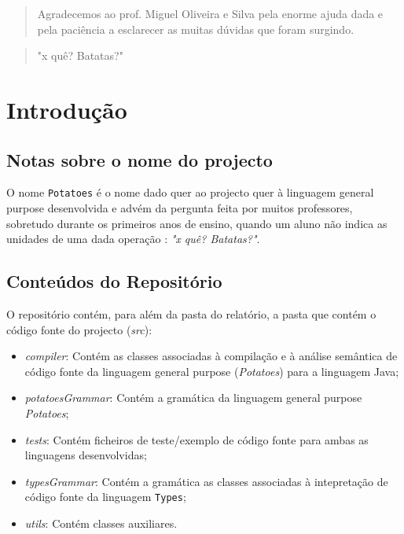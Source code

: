 \documentclass{report}
\begin{document}
\renewcommand{\abstractname}{Agradecimentos}
\begin{abstract}
Agradecemos ao prof. Miguel Oliveira e Silva pela enorme ajuda dada e pela paciência a esclarecer as muitas dúvidas que foram surgindo.
\end{abstract}

\renewcommand{\abstractname}{}
\begin{abstract}
"x quê? Batatas?"
\end{abstract}

\tableofcontents
\lstlistoflistings

\clearpage
{}

\chapter{Introdução}
\label{chap.introducao}

\section{Notas sobre o nome do projecto}
O nome \texttt{Potatoes} é o nome dado quer ao projecto quer à linguagem general purpose desenvolvida e advém da pergunta feita por muitos professores, sobretudo durante os primeiros anos de ensino, quando um aluno não indica as unidades de uma dada operação :\textit{ "x quê? Batatas?"}. 


\section{Conteúdos do Repositório}
O repositório contém, para além da pasta do relatório, a pasta que contém o código fonte do projecto (\textit{src}):

\begin{itemize}
    \item \textit{compiler}: Contém as classes associadas à compilação e à análise semântica de código fonte da linguagem general purpose (\textit{Potatoes}) para a linguagem Java; 
    \item \textit{potatoesGrammar}: Contém a gramática da linguagem general purpose \textit{Potatoes}; 
    \item \textit{tests}: Contém ficheiros de teste/exemplo de código fonte para ambas as linguagens desenvolvidas; 
    \item \textit{typesGrammar}: Contém a gramática as classes associadas à intepretação de código fonte da linguagem \texttt{Types}; 
    \item \textit{utils}: Contém classes auxiliares. 
\end{itemize}
\end{document}
